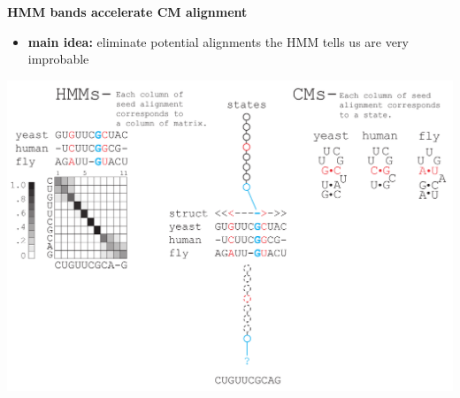 \documentclass[landscape]{slides}
\begin{document}
\begin{slide}
\begin{center}

\textbf{HMM bands accelerate CM alignment}
\end{center}
\medskip
\small
\begin{itemize}
\item
\textbf{main idea:} eliminate potential alignments the HMM tells us are very improbable
\end{itemize}
\begin{center}
\includegraphics[width=8in]{figs/post_hmm_to_cm_map2_layer11}
\end{center}
\vfill
\end{slide}
\end{document}
